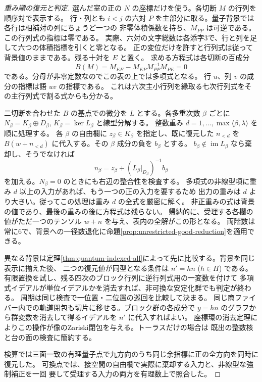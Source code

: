 \begin{proof}[重み順の復元と判定]
選んだ室の正の $N$ の座標だけを使う。各切断 $M$ の行列を順序対で表示する。
行・列とも $i<j$ の六対 $P$ を主部分に取る。量子背景では各行は相補対の列にちょうど一つの
非零体積係数を持ち、$M_{PP}$ は可逆である。この行列式の指標は零である。
実際、六対の文字総数は各添字3で、行と列を足して六つの体積指標を引くと零となる。
正の変位だけを許すと行列式は従って背景値のままである。残る十対を $E$ と置く。
求める方程式は各切断の百成分
\[
 B(M)=M_{EE}-M_{EP}M_{PP}^{-1}M_{PE}=0
\]
である。分母が非零定数なのでこの表の上では多項式となる。
行 $u$、列 $v$ の成分の指標は語 $uv$ の指標である。
これは六次主小行列を縁取る七次行列式をその主行列式で割る式からも分かる。

二切断を合わせた $B$ の基点での微分を $L$ とする。各多重次数 $\beta$ ごとに
$N_\beta=K_\beta\oplus D_\beta$, $K_\beta=\ker L_\beta$ と線型分解する。
整数重み $d=1,\ldots,\max\langle\beta,\lambda\rangle$ を順に処理する。
各 $\beta$ の自由欄に $z_\beta\in K_\beta$ を指定し、既に復元した
$n_{<d}$ を $B(w+n_{<d})$ に代入する。その $\beta$ 成分の負を $b_\beta$ とする。
$b_\beta\notin\operatorname{im} L_\beta$ なら棄却し、そうでなければ
\[
 n_\beta=z_\beta+(L_\beta|_{D_\beta})^{-1}b_\beta
\]
を加える。$N_\beta=0$ のときにも右辺の整合性を検査する。
多項式の非線型項に重み $d$ 以上の入力があれば、もう一つの正の入力を要するため
出力の重みは $d$ より大きい。従ってこの処理は重み $d$ の全式を厳密に解く。
非正重みの式は背景の値であり、最後の重みの後に方程式は残らない。
帰納的に、受理する各欄の値がただ一つのテンソル $w+n$ を与え、表内の全解がこの形となる。
両階数は常に6で、背景への一径数退化に命題\ref{prop:unrestricted-good-reduction}を適用できる。

異なる背景は定理\ref{thm:quantum-indexed-all}によって先に比較する。背景を同じ表示に揃えた後、
二つの復元値が同型となる条件は $n'=hn$ ($h\in H$) である。
有限置換を試し、残る四次のブロック行列に逆行列式用の一変数を付けて
多項式イデアルが単位イデアルかを消去すれば、非可換な安定化群でも判定が終わる。
周期は同じ検査で一位置・二位置の巡回を比較して決まる。
同じ商ファイバー内での軌道閉包も切片に移せる。ブロック群の各成分で
$y=hn$ のグラフから群変数を消去して得るイデアルを $n'$ に代入すればよい。
座標環の消去定理によりこの操作が像のZariski閉包を与える。トーラスだけの場合は
既出の整数核と台の面の検査に簡約する。

検算では三面一致の有理量子点で九方向のうち同じ余指標に正の全方向を同時に復元した。
可換点では、接空間の自由欄で実際に棄却する入力と、非線型な強制補正を一回
要して受理する入力の両方を有理数上で照合した。
\end{proof}
